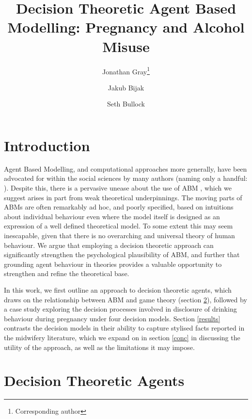 \documentclass[twocolumn]{article}
\title{Decision Theoretic Agent Based Modelling: Pregnancy and Alcohol Misuse}
\author{Jonathan Gray\footnote{Corresponding author}}
\author{Jakub Bijak}
\author{Seth Bullock}
\affil{University of Southampton}
\date{\vspace{-5ex}}
\begin{document}
\maketitle
{}


\section{Introduction} %

Agent Based Modelling, and computational approaches more generally, have been advocated for within the social sciences by many authors (naming only a handful: \citet{Axelrod1997, epstein1994growing, agent_zero, gilbert1999simulation, Macy2002a, Resnick,Silverman2011,Silverman2013}). Despite this, there is a pervasive unease about the use of ABM \citep{Waldherr2013}, which we suggest arises in part from weak theoretical underpinnings. The moving parts of ABMs are often remarkably ad hoc, and poorly specified, based on intuitions about individual behaviour even where the model itself is designed as an expression of a well defined theoretical model. To some extent this may seem inescapable, given that there is no overarching and universal theory of human behaviour. We argue that employing a decision theoretic approach can significantly strengthen the psychological plausibility of ABM, and further that grounding agent behaviour in theories provides a valuable opportunity to strengthen and refine the theoretical base.


In this work, we first outline an approach to decision theoretic agents, which draws on the relationship between ABM and game theory (section \ref{dec_theory}), followed by a case study exploring the decision processes involved in disclosure of drinking behaviour during pregnancy under four decision models. Section \ref{results} contrasts the decision models in their ability to capture stylised facts reported in the midwifery literature, which we expand on in section \ref{conc} in discussing the utility of the approach, as well as the limitations it may impose.

\section{Decision Theoretic Agents}\label{dec_theory} %
\end{document}
